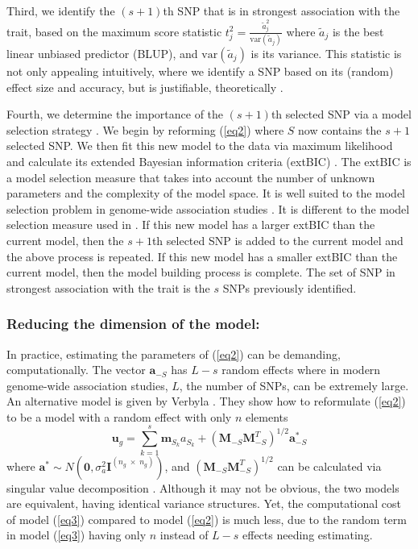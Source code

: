 \documentclass{bioinfo}
\newcommand{\bu}{\bm{u}}
\newcommand{\ba}{\bm{a}}
\newcommand{\bzero}{\bm{0}}
\newcommand{\bI}{\bm{I}}
\newcommand{\bM}{\bm{M}}
\newcommand{\bmm}{\bm{m}}
\begin{document}
Third, we identify the $(s+1)$th SNP that is in strongest association with the trait, based on the maximum score statistic
$t_j^2 = \frac{ \widetilde{a} _j^2}{\textrm{var}(\widetilde{a}_j)}$ where $\widetilde{a}_j$ is the best linear unbiased predictor (BLUP), 
and $\textrm{var}(\widetilde{a}_j)$ is its variance. This statistic is not only appealing intuitively, where we 
identify a SNP based on its (random) effect size and accuracy, but is justifiable, theoretically \citep{verbyla2012rwgaim}.

Fourth, we determine the importance of the $(s+1)$th selected SNP via a model selection strategy  \citep{verbyla2007analysis}. 
We begin by reforming (\ref{eq2}) where $S$ now contains the $s + 1$ selected SNP.  We then fit this new model to the data
via maximum likelihood and calculate its extended Bayesian information criteria (extBIC) \citep{chen2008extended}.  The 
extBIC is a model selection measure that takes into account the number of unknown parameters and the complexity 
of the model space.  It is well suited to the model selection problem in genome-wide association studies \citep{chen2008extended}. 
It is different to the model selection measure used in  \citep{verbyla2007analysis}.
If this new model has a larger extBIC than the current model, then the $s+1$th selected SNP is added to 
the current model and the above process is repeated. If this new model has a smaller extBIC than the current model, then the 
model building process is complete. The set of SNP in strongest association with the trait is the $s$ SNPs previously identified. 

\subsubsection {Reducing the dimension of the model:} 

In practice, estimating the parameters of (\ref{eq2}) can be demanding, computationally. 
The vector $\ba_{-S}$ has $L-s$ random effects where in modern genome-wide association studies, 
$L$, the number of SNPs, can be extremely large.  An alternative model is given by 
Verbyla \citep{verbyla2012rwgaim,verbyla2014whole}. 
They show how to reformulate (\ref{eq2}) to be a model with a random effect with only $n$ elements
\begin{equation}
\label{eq3}
\bu_g = \sum_{k=1}^s  \bmm_{S_k} a_{S_k} + (\bM_{-S} \bM_{-S}^T)^{1/2} \ba^*_{-S}
\end{equation}
where $\ba^* \sim N(\bzero, \sigma_a^2 \bI^{(n_g \; \times \;  n_g)})$, and 
$(\bM_{-S} \bM_{-S}^T)^{1/2}$ can be calculated via singular value decomposition \citep{golub2012matrix}.  
Although it may not be obvious, the two models are equivalent, 
having identical variance structures. Yet, the computational cost of model (\ref{eq3}) compared to 
model (\ref{eq2}) is much less, due to the random term in model (\ref{eq3}) having only $n$ instead of $L-s$ 
effects needing estimating. 
\end{document}
